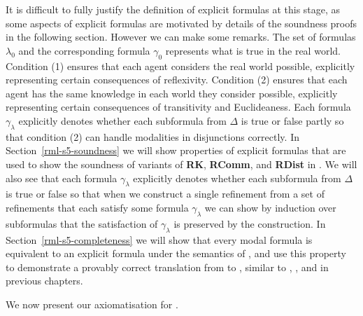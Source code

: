 It is difficult to fully justify the definition of explicit formulas at this stage, as some aspects of explicit formulas are motivated by details of the soundness proofs in the following section.
However we can make some remarks.
The set of formulas $\lambda_0$ and the corresponding formula $\gamma_0$ represents what is true in the real world.
Condition (1) ensures that each agent considers the real world possible, explicitly representing certain consequences of reflexivity.
Condition (2) ensures that each agent has the same knowledge in each world they consider possible, explicitly representing certain consequences of transitivity and Euclideaness.
Each formula $\gamma_\lambda$ explicitly denotes whether each subformula from $\Delta$ is true or false partly so that condition (2) can handle modalities in disjunctions correctly.
In Section~\ref{rml-s5-soundness} we will show properties of explicit formulas that are used to show the soundness of variants of {\bf RK}, {\bf RComm}, and {\bf RDist} in \logicRmlS{}.
We will also see that each formula $\gamma_\lambda$ explicitly denotes whether each subformula from $\Delta$ is true or false so that when we construct a single refinement from a set of refinements that each satisfy some formula $\gamma_\lambda$ we can show by induction over subformulas that the satisfaction of $\gamma_\lambda$ is preserved by the construction.
In Section~\ref{rml-s5-completeness} we will show that every modal formula is equivalent to an explicit formula under the semantics of \logicS{}, and use this property to demonstrate a provably correct translation from \langRml{} to \langMl{}, similar to \logicRmlK{}, \logicRmlKFF{}, and \logicRmlKD{} in previous chapters.

We now present our axiomatisation for \logicRmlS{}.

